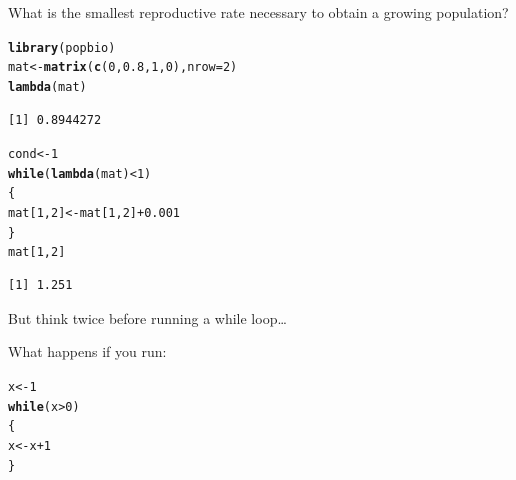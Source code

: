 \documentclass[10pt]{beamer}\usepackage[]{graphicx}\usepackage[]{color}
\makeatletter
\newcommand{\hlnum}[1]{\textcolor[rgb]{0.686,0.059,0.569}{#1}}%
\newcommand{\hlopt}[1]{\textcolor[rgb]{0,0,0}{#1}}%
\newcommand{\hlstd}[1]{\textcolor[rgb]{0.345,0.345,0.345}{#1}}%
\newcommand{\hlkwa}[1]{\textcolor[rgb]{0.161,0.373,0.58}{\textbf{#1}}}%
\newcommand{\hlkwb}[1]{\textcolor[rgb]{0.69,0.353,0.396}{#1}}%
\newcommand{\hlkwc}[1]{\textcolor[rgb]{0.333,0.667,0.333}{#1}}%
\newcommand{\hlkwd}[1]{\textcolor[rgb]{0.737,0.353,0.396}{\textbf{#1}}}%
\newenvironment{kframe}{%
 \def\at@end@of@kframe{}%
 \ifinner\ifhmode%
  \def\at@end@of@kframe{\end{minipage}}%
  \begin{minipage}{\columnwidth}%
 \fi\fi%
 \def\FrameCommand##1{\hskip\@totalleftmargin \hskip-\fboxsep
 \colorbox{shadecolor}{##1}\hskip-\fboxsep
     \hskip-\linewidth \hskip-\@totalleftmargin \hskip\columnwidth}%
 \MakeFramed {\advance\hsize-\width
   \@totalleftmargin\z@ \linewidth\hsize
   \@setminipage}}%
 {\par\unskip\endMakeFramed%
 \at@end@of@kframe}
\newenvironment{knitrout}{}{} %
\makeatother
\begin{document}
\begin{frame}[fragile]{What is the smallest reproductive rate necessary to obtain a growing population?}
\begin{knitrout}
\color{fgcolor}\begin{kframe}
\begin{alltt}
\hlkwd{library}\hlstd{(popbio)}
\hlstd{mat} \hlkwb{<-} \hlkwd{matrix}\hlstd{(}\hlkwd{c}\hlstd{(}\hlnum{0}\hlstd{,}\hlnum{0.8}\hlstd{,}\hlnum{1}\hlstd{,}\hlnum{0}\hlstd{),} \hlkwc{nrow} \hlstd{=} \hlnum{2}\hlstd{)}
\hlkwd{lambda}\hlstd{(mat)}
\end{alltt}
\begin{verbatim}
[1] 0.8944272
\end{verbatim}
\begin{alltt}
\hlstd{cond} \hlkwb{<-} \hlnum{1}
\hlkwa{while}\hlstd{(}\hlkwd{lambda}\hlstd{(mat)} \hlopt{<} \hlnum{1} \hlstd{)}
\hlstd{\{}
  \hlstd{mat[}\hlnum{1}\hlstd{,}\hlnum{2}\hlstd{]} \hlkwb{<-} \hlstd{mat[}\hlnum{1}\hlstd{,}\hlnum{2}\hlstd{]}\hlopt{+}\hlnum{0.001}
\hlstd{\}}
\hlstd{mat[}\hlnum{1}\hlstd{,}\hlnum{2}\hlstd{]}
\end{alltt}
\begin{verbatim}
[1] 1.251
\end{verbatim}
\end{kframe}
\end{knitrout}

\end{frame}

\begin{frame}[fragile]{But think twice before running a while loop\dots}
  
What happens if you run:
\begin{knitrout}
\color{fgcolor}\begin{kframe}
\begin{alltt}
\hlstd{x} \hlkwb{<-} \hlnum{1}
\hlkwa{while}\hlstd{(x}\hlopt{>}\hlnum{0}\hlstd{)}
\hlstd{\{}
  \hlstd{x} \hlkwb{<-} \hlstd{x} \hlopt{+} \hlnum{1}
\hlstd{\}}
\end{alltt}
\end{kframe}
\end{knitrout}

\end{frame}
\end{document}
